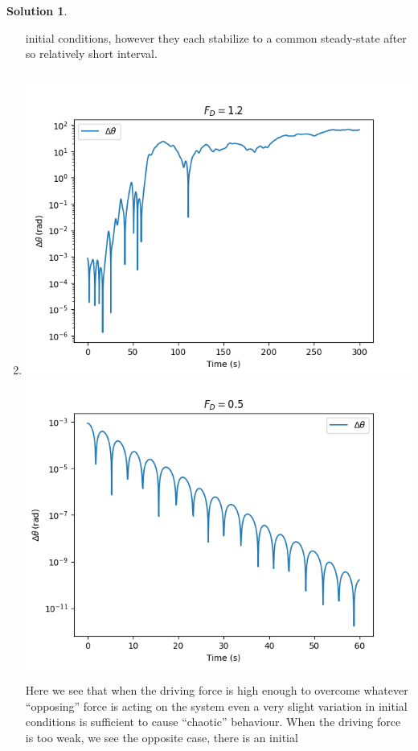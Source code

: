 \documentclass[10pt]{article}
\theoremstyle{definition}
\newtheorem{soln}{Solution}
\begin{document}
\begin{soln}
\begin{enumerate}[label=(\alph*)]
                  initial conditions, however they each stabilize to a common steady-state after so relatively short interval. 
            \item \inputminted[breaklines, autogobble]{python3}{./python/q2/q2b.py}
                  \begin{center}
                        \includegraphics[scale=0.75]{Figure_6-1.png}
                        \includegraphics[scale=0.75]{Figure_6-2.png}
                  \end{center}
                  Here we see that when the driving force is high enough to overcome whatever ``opposing'' force is acting on the system even a very slight variation
                  in initial conditions is sufficient to cause ``chaotic'' behaviour. When the driving force is too weak, we see the opposite case, there is an initial

\end{enumerate}
\end{soln}
\end{document}
